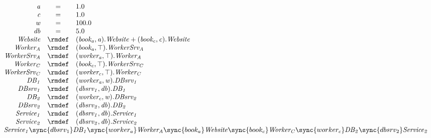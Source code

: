 \begin{displaymath}
	\begin{array}{rcl}
		\mathit{a} & = & 1.0\\
		\mathit{c} & = & 1.0\\
		\mathit{w} & = & 100.0\\
		\mathit{db} & = & 5.0\\
[0.0ex]		\mathit{Website} & \rmdef & (\mathit{book_a},\mathit{a}).\mathit{Website}+(\mathit{book_c},\mathit{c}).\mathit{Website}\\
		\mathit{Worker_A} & \rmdef & (\mathit{book_a},\top).\mathit{WorkerSrv_A}\\
		\mathit{WorkerSrv_A} & \rmdef & (\mathit{worker_a},\top).\mathit{Worker_A}\\
		\mathit{Worker_C} & \rmdef & (\mathit{book_c},\top).\mathit{WorkerSrv_C}\\
		\mathit{WorkerSrv_C} & \rmdef & (\mathit{worker_c},\top).\mathit{Worker_C}\\
		\mathit{DB_1} & \rmdef & (\mathit{worker_a},\mathit{w}).\mathit{DBsrv_1}\\
		\mathit{DBsrv_1} & \rmdef & (\mathit{dbsrv_1},\mathit{db}).\mathit{DB_1}\\
		\mathit{DB_2} & \rmdef & (\mathit{worker_c},\mathit{w}).\mathit{DBsrv_2}\\
		\mathit{DBsrv_2} & \rmdef & (\mathit{dbsrv_2},\mathit{db}).\mathit{DB_2}\\
		\mathit{Service_1} & \rmdef & (\mathit{dbsrv_1},\mathit{db}).\mathit{Service_1}\\
		\mathit{Service_2} & \rmdef & (\mathit{dbsrv_2},\mathit{db}).\mathit{Service_2}\\
[0.0ex]		\multicolumn{3}{l}{\mathit{Service_1}\sync{dbsrv_1}\mathit{DB_1}\sync{worker_a}\mathit{Worker_A}\sync{book_a}\mathit{Website}\sync{book_c}\mathit{Worker_C}\sync{worker_c}\mathit{DB_2}\sync{dbsrv_2}\mathit{Service_2}}\\
[0.0ex]	\end{array}
\end{displaymath}
